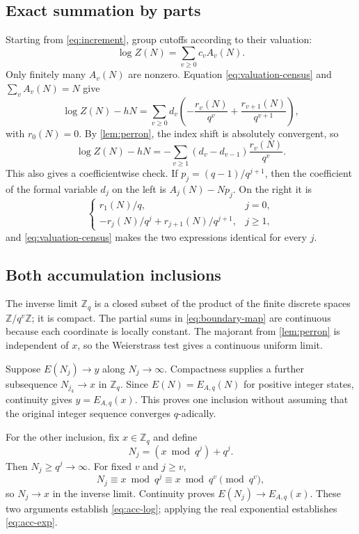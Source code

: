 \subsection{Exact summation by parts}

Starting from \eqref{eq:increment}, group cutoffs according to their
valuation:
\[
  \log Z(N)=\sum_{v\ge0}c_vA_v(N).
\]
Only finitely many \(A_v(N)\) are nonzero.  Equation
\eqref{eq:valuation-census} and \(\sum_vA_v(N)=N\) give
\[
  \log Z(N)-hN
  =\sum_{v\ge0}d_v
   (-\frac{r_v(N)}{q^v}
         +\frac{r_{v+1}(N)}{q^{v+1}}),
\]
with \(r_0(N)=0\).  By \cref{lem:perron}, the index shift is absolutely
convergent, so
\[
  \log Z(N)-hN
  =-\sum_{v\ge1}(d_v-d_{v-1})\frac{r_v(N)}{q^v}.
\]
This also gives a coefficientwise check.  If
\(p_j=(q-1)/q^{j+1}\), then the coefficient of the formal variable \(d_j\)
on the left is \(A_j(N)-Np_j\).  On the right it is
\[
  \begin{cases}
    r_1(N)/q,&j=0,\\[1mm]
    -r_j(N)/q^j+r_{j+1}(N)/q^{j+1},&j\ge1,
  \end{cases}
\]
and \eqref{eq:valuation-census} makes the two expressions identical for
every \(j\).

\subsection{Both accumulation inclusions}

The inverse limit \(\mathbb Z_q\) is a closed subset of the product of the
finite discrete spaces \(\mathbb Z/q^v\mathbb Z\); it is compact.  The
partial sums in \eqref{eq:boundary-map} are continuous because each
coordinate is locally constant.  The majorant from \cref{lem:perron} is
independent of \(x\), so the Weierstrass test gives a continuous uniform
limit.

Suppose \(E(N_j)\to y\) along \(N_j\to\infty\).  Compactness supplies a
further subsequence \(N_{j_k}\to x\) in \(\mathbb Z_q\).  Since
\(E(N)=E_{A,q}(N)\) for positive integer states, continuity gives
\(y=E_{A,q}(x)\).  This proves one inclusion without assuming that the
original integer sequence converges \(q\)-adically.

For the other inclusion, fix \(x\in\mathbb Z_q\) and define
\[
  N_j=(x\bmod q^j)+q^j.
\]
Then \(N_j\ge q^j\to\infty\).  For fixed \(v\) and \(j\ge v\),
\[
  N_j\equiv x\bmod q^j\equiv x\bmod q^v\pmod{q^v},
\]
so \(N_j\to x\) in the inverse limit.  Continuity proves
\(E(N_j)\to E_{A,q}(x)\).  These two arguments establish
\eqref{eq:acc-log}; applying the real exponential establishes
\eqref{eq:acc-exp}.

